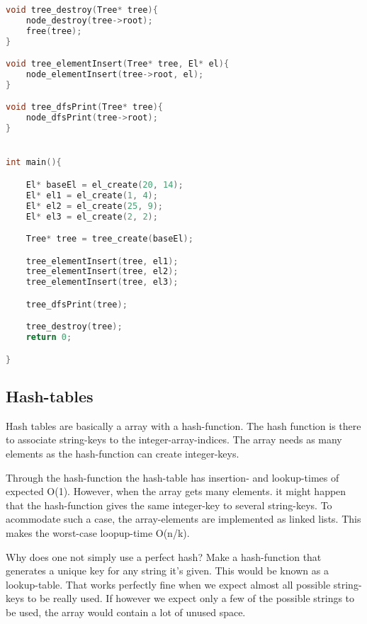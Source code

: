 \begin{lstlisting}[language=c]
void tree_destroy(Tree* tree){
	node_destroy(tree->root);
	free(tree);
}

void tree_elementInsert(Tree* tree, El* el){
	node_elementInsert(tree->root, el);
}

void tree_dfsPrint(Tree* tree){
	node_dfsPrint(tree->root);
}


int main(){

	El* baseEl = el_create(20, 14);
	El* el1 = el_create(1, 4);
	El* el2 = el_create(25, 9);
	El* el3 = el_create(2, 2);

	Tree* tree = tree_create(baseEl);

	tree_elementInsert(tree, el1);
	tree_elementInsert(tree, el2);
	tree_elementInsert(tree, el3);

	tree_dfsPrint(tree);

	tree_destroy(tree);
	return 0;

}

\end{lstlisting}

\subsection{Hash-tables}

Hash tables are basically a array with a hash-function. The hash function is there to associate string-keys to the integer-array-indices. The array needs as many elements as the hash-function can create integer-keys. 

Through the hash-function the hash-table has insertion- and lookup-times of expected O(1). However, when the array gets many elements. it might happen that the hash-function gives the same integer-key to several string-keys. To acommodate such a case, the array-elements are implemented as linked lists. This makes the worst-case loopup-time O(n/k).


Why does one not simply use a perfect hash? Make a hash-function that generates a unique key for any string it's given. This would be known as a lookup-table. That works perfectly fine when we expect almost all possible string-keys to be really used. If however we  expect only a few of the possible strings to be used, the array would contain a lot of unused space.